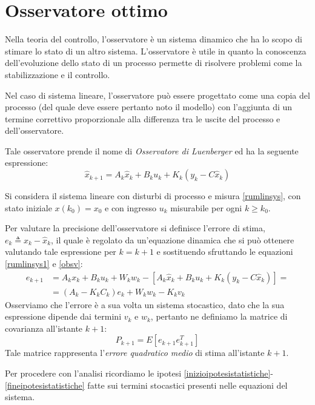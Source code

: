 \section{Osservatore ottimo}
Nella teoria del controllo, l'osservatore è un sistema dinamico che ha lo scopo di stimare lo stato di un altro sistema. L'osservatore è utile in quanto la conoscenza dell'evoluzione dello stato di un processo permette di risolvere problemi come la stabilizzazione e il controllo.

Nel caso di sistema lineare, l'osservatore può essere progettato come una copia del processo (del quale deve essere pertanto noto il modello) con l'aggiunta di un termine correttivo proporzionale alla differenza tra le uscite del processo e dell'osservatore. 

Tale osservatore prende il nome di \textit{Osservatore di Luenberger} ed ha la seguente espressione:
\begin{equation}
\label{obsv}
\hat{x}_{k+1}=A_k\hat{x}_k+B_ku_k+K_k(y_k-C\hat{x}_k)
\end{equation}

Si considera il sistema lineare con disturbi di processo e misura \eqref{rumlinsys},
con stato iniziale $x(k_0)=x_0$ e con ingresso $u_k$ misurabile per ogni $k \geq k_0$.

Per valutare la precisione dell'osservatore si definisce l'errore di stima, \\ $e_k \triangleq x_k-\hat{x}_k$, il quale è regolato da un'equazione dinamica che si può ottenere valutando tale espressione per $k=k+1$ e sostituendo sfruttando le equazioni \eqref{rumlinsys1} e \eqref{obsv}:
\begin{equation}
\label{errore}
\begin{split}
e_{k+1}&=A_kx_k+B_ku_k+W_kw_k-[A_k\hat{x}_k+B_ku_k+K_k(y_k-C\hat{x}_k)] = \\
&=(A_k-K_kC_k)e_k+W_kw_k-K_kv_k
\end{split}
\end{equation}
Osserviamo che l'errore è a sua volta un sistema stocastico, dato che la sua espressione dipende dai termini $v_k$ e $w_k$, pertanto ne definiamo la matrice di covarianza all'istante $k+1$:
\begin{equation}
\label{matrcov}
P_{k+1}=E[e_{k+1}e_{k+1}^T]
\end{equation}
Tale matrice rappresenta l'\textit{errore quadratico medio} di stima all'istante $k+1$.

Per procedere con l'analisi ricordiamo le ipotesi \eqref{inizioipotesistatistiche}-\eqref{fineipotesistatistiche} fatte sui termini stocastici presenti nelle equazioni del sistema.